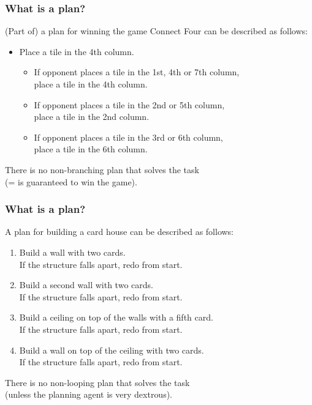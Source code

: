 \documentclass{gkibeamer}
\begin{document}
\begin{frame}
  \frametitle{What is a plan?}

  \begin{example}[Branching]
    (Part of) a plan for winning the game \alert{Connect Four} can be
    described as follows:
    \begin{itemize}
    \item Place a tile in the 4th column.
      \begin{itemize}
      \item If opponent places a tile in the 1st, 4th or 7th column, \\
        place a tile in the 4th column.
      \item If opponent places a tile in the 2nd or 5th column, \\
        place a tile in the 2nd column.
      \item If opponent places a tile in the 3rd or 6th column, \\
        place a tile in the 6th column.
      \end{itemize}
    \end{itemize}
    
    There is no \alert{non-branching} plan that solves the task\\
    (= is guaranteed to win the game).
  \end{example}
\end{frame}

\begin{frame}
  \frametitle{What is a plan?}

  \begin{example}[Looping]
    A plan for building a card house can be described as follows:
    \begin{enumerate}
    \item Build a wall with two cards. \\
      If the structure falls apart, redo from start.
    \item Build a second wall with two cards. \\
      If the structure falls apart, redo from start.
    \item Build a ceiling on top of the walls with a fifth card. \\
      If the structure falls apart, redo from start.
    \item Build a wall on top of the ceiling with two cards. \\
      If the structure falls apart, redo from start.
    \end{enumerate}
    
    There is no \alert{non-looping} plan that solves the task \\
    (unless the planning agent is very dextrous).
  \end{example}
\end{frame}
\end{document}
